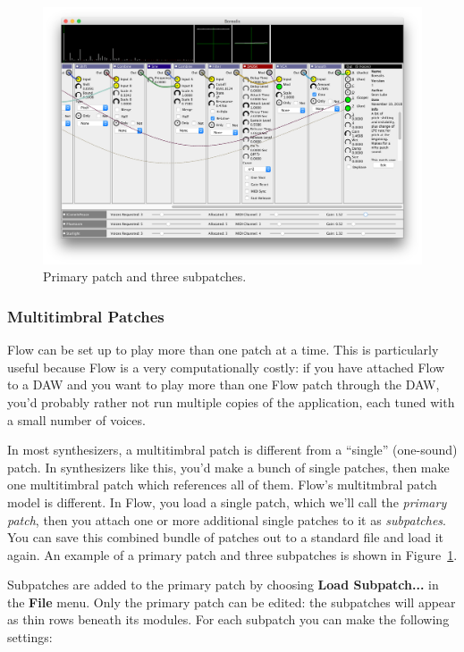 \documentclass{article}
\begin{document}
\begin{figure}[t]
\begin{center}\includegraphics[width=6.5in]{subpatches}\end{center}
\vspace{-3em}
\caption{Primary patch and three subpatches.}
\label{subpatches}
\end{figure}

\subsubsection{Multitimbral Patches}
\label{multitimbral}

Flow can be set up to play more than one patch at a time. This is particularly useful because Flow is a very computationally costly: if you have attached Flow to a DAW and you want to play more than one Flow patch through the DAW, you'd probably rather not run multiple copies of the application, each tuned with a small number of voices.

In most synthesizers, a multitimbral patch is different from a ``single'' (one-sound) patch.  In synthesizers like this, you'd make a bunch of single patches, then make one multitimbral patch which references all of them.  Flow's multitmbral patch model is different.  In Flow, you load a single patch, which we'll call the {\it primary patch}, then you attach one or more additional single patches to it as {\it subpatches}.  You can save this combined bundle of patches out to a standard file and load it again.  An example of a primary patch and three subpatches is shown in Figure~\ref{subpatches}.

Subpatches are added to the primary patch by choosing {\bf Load Subpatch...} in the {\bf File} menu.  Only the primary patch can be edited: the subpatches will appear as thin rows beneath its modules.  For each subpatch you can make the following settings:
\end{document}
